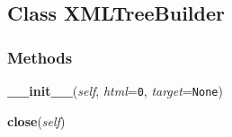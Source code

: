

\subsection{Class XMLTreeBuilder}

    \label{xml:etree:ElementTree:XMLTreeBuilder}


  \subsubsection{Methods}

    \label{xml:etree:ElementTree:XMLTreeBuilder:__init__}

    \vspace{0.5ex}

\hspace{.8\funcindent}\begin{boxedminipage}{\funcwidth}

    \raggedright \textbf{\_\_init\_\_}(\textit{self}, \textit{html}={\tt 0}, \textit{target}={\tt None})

\setlength{\parskip}{2ex}
\setlength{\parskip}{1ex}
    \end{boxedminipage}

    \label{xml:etree:ElementTree:XMLTreeBuilder:close}

    \vspace{0.5ex}

\hspace{.8\funcindent}\begin{boxedminipage}{\funcwidth}

    \raggedright \textbf{close}(\textit{self})

\setlength{\parskip}{2ex}
\setlength{\parskip}{1ex}
    \end{boxedminipage}


